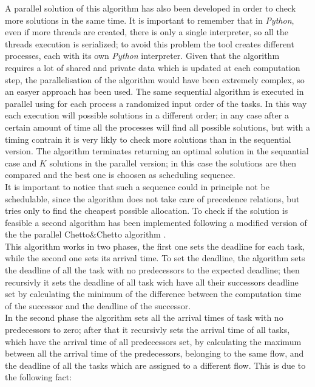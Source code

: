 \documentclass[a4paper,11pt,oneside]{book}
\begin{document}
A parallel solution of this algorithm has also been developed in order to check more solutions in the same time. It is important to remember that in \emph{Python}, even if more threads are created, there is only a single interpreter, so all the threads execution is serialized; to avoid this problem the tool creates different processes, each with its own \emph{Python} interpreter. Given that the algorithm requires a lot of shared and private data which is updated at each computation step, the parallelisation of the algorithm would have been extremely complex, so an easyer approach has been used. The same sequential algorithm is executed in parallel using for each process a randomized input order of the tasks. In this way each execution will possible solutions in a different order; in any case after a certain amount of time all the processes will find all possible solutions, but with a timing contrain it is very likly to check more solutions than in the sequential version. The algorithm terminates returning an optimal solution in the sequantial case and $K$ solutions in the parallel version; in this case the solutions are then compared and the best one is choosen as scheduling sequence. \\
It is important to notice that such a sequence could in principle not be schedulable, since the algorithm does not take care of precedence relations, but tries only to find the cheapest possible allocation. To check if the solution is feasible a second algorithm has been implemented following a modified version of the the parallel Chetto$\&$Chetto algorithm \cite{bbw2}.\\
This algorithm works in two phases, the first one sets the deadline for each task, while the second one sets its arrival time. To set the deadline, the algorithm sets the deadline of all the task with no predecessors to the expected deadline; then recursivly it sets the deadline of all task wich have all their successors deadline set by calculating the minimum of the difference between the computation time of the successor and the deadline of the successor. \\
In the second phase the algorithm sets all the arrival times of task with no predecessors to zero; after that it recursivly sets the arrival time of all tasks, which have the arrival time of all predecessors set, by calculating the maximum between all the arrival time of the predecessors, belonging to the same flow, and the deadline of all the tasks which are assigned to a different flow. This is due to the following fact: \\
\end{document}
